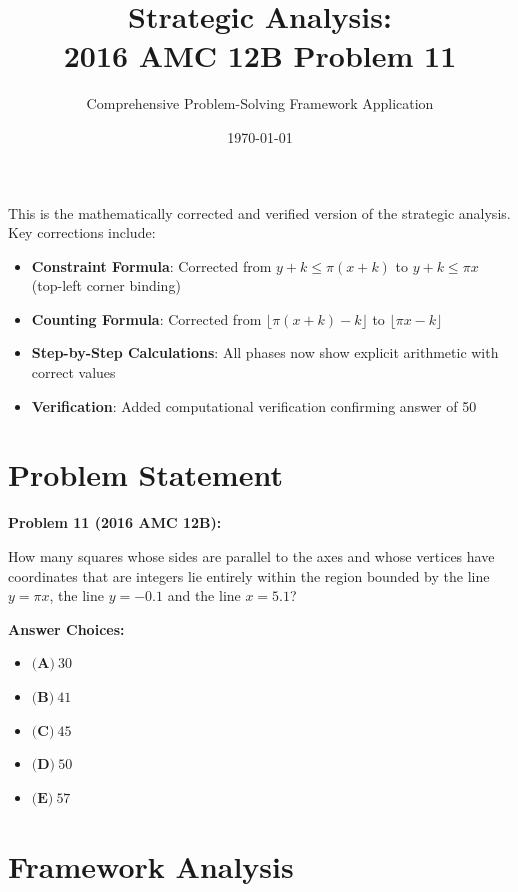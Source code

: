 \documentclass[12pt]{article}
\title{\textbf{Strategic Analysis:\\2016 AMC 12B Problem 11}}
\author{Comprehensive Problem-Solving Framework Application}
\date{\today}
\begin{document}
\maketitle

\begin{tcolorbox}[colback=green!5!white,colframe=green!75!black,title=\textbf{Document Status: CORRECTED VERSION}]
This is the mathematically corrected and verified version of the strategic analysis. Key corrections include:
\begin{itemize}
    \item \textbf{Constraint Formula}: Corrected from $y+k \leq \pi(x+k)$ to $y+k \leq \pi x$ (top-left corner binding)
    \item \textbf{Counting Formula}: Corrected from $\lfloor \pi(x+k) - k \rfloor$ to $\lfloor \pi x - k \rfloor$
    \item \textbf{Step-by-Step Calculations}: All phases now show explicit arithmetic with correct values
    \item \textbf{Verification}: Added computational verification confirming answer of 50
\end{itemize}
\end{tcolorbox}

\section*{Problem Statement}

\begin{tcolorbox}[colback=gray!10!white,colframe=gray!75!black]
\textbf{Problem 11 (2016 AMC 12B):}

How many squares whose sides are parallel to the axes and whose vertices have coordinates that are integers lie entirely within the region bounded by the line $y=\pi x$, the line $y=-0.1$ and the line $x=5.1$?

\textbf{Answer Choices:}
\begin{itemize}
    \item $\textbf{(A)}\ 30$
    \item $\textbf{(B)}\ 41$
    \item $\textbf{(C)}\ 45$
    \item $\textbf{(D)}\ 50$
    \item $\textbf{(E)}\ 57$
\end{itemize}
\end{tcolorbox}

\newpage

\section{Framework Analysis}
\end{document}

